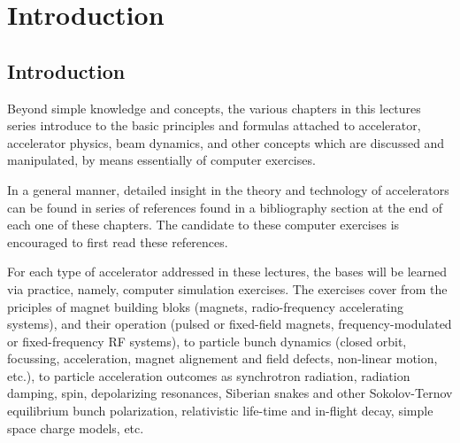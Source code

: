 



\chapter[Introduction]{Introduction}\label{chapIntroduction}


\section{Introduction}\label{secIntroduction}

Beyond simple knowledge and concepts, the various 
chapters in this lectures series introduce to the basic principles and formulas attached 
to  accelerator, accelerator physics,  beam dynamics, and other concepts 
which are discussed and manipulated, by means essentially of  computer exercises. 

In a general manner, detailed insight in the theory and technology  of accelerators 
can be found in  series of references found in a bibliography section at the end of each one of these chapters. 
The candidate to these computer exercises  is encouraged to first read these references. 

For each type of accelerator addressed in these lectures, 
the bases will be learned via  practice, namely,  computer simulation exercises. 
The exercises cover 
from the priciples of magnet building bloks (magnets, radio-frequency accelerating systems), 
and their operation (pulsed or fixed-field magnets, frequency-modulated or fixed-frequency RF systems), 
to particle bunch dynamics (closed orbit, focussing, acceleration, 
magnet alignement and field defects, non-linear motion, etc.), 
to particle acceleration outcomes as synchrotron radiation, 
radiation damping, spin, depolarizing resonances, Siberian snakes 
 and other Sokolov-Ternov equilibrium bunch polarization, relativistic life-time and in-flight decay, 
simple space charge models, etc. 



